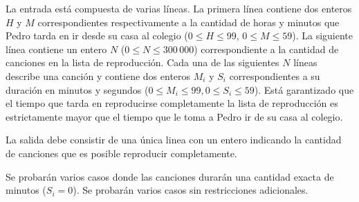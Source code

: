 \documentclass{oci}
\begin{document}
\begin{inputDescription}
  La entrada está compuesta de varias líneas.
  La primera línea contiene dos enteros $H$ y $M$ correspondientes
  respectivamente a la cantidad de horas y minutos que Pedro tarda en ir desde su
  casa al colegio ($0\leq H\leq 99$, $0\leq M\leq 59$).
  La siguiente línea contiene un entero $N$ ($0\leq N\leq 300\,000$)
  correspondiente a la cantidad de canciones en la lista de reproducción.
  Cada una de las siguientes $N$ líneas describe una canción y contiene dos
  enteros $M_i$ y $S_i$ correspondientes a su duración en minutos y segundos
  ($0\leq M_i\leq 99, 0\leq S_i\leq 59$).
  Está garantizado que el tiempo que tarda en reproducirse completamente la
  lista de reproducción es estrictamente mayor que el tiempo que le toma a Pedro
  ir de su casa al colegio.
\end{inputDescription}

\begin{outputDescription}
  La salida debe consistir de una única linea con un entero indicando la cantidad
  de canciones que es posible reproducir completamente.
\end{outputDescription}

\begin{scoreDescription}
   Se probarán varios casos donde las canciones durarán una cantidad
  exacta de minutos ($S_i = 0$).
   Se probarán varios casos sin restricciones adicionales. 
\end{scoreDescription}

\begin{sampleDescription}
\end{sampleDescription}
\end{document}
